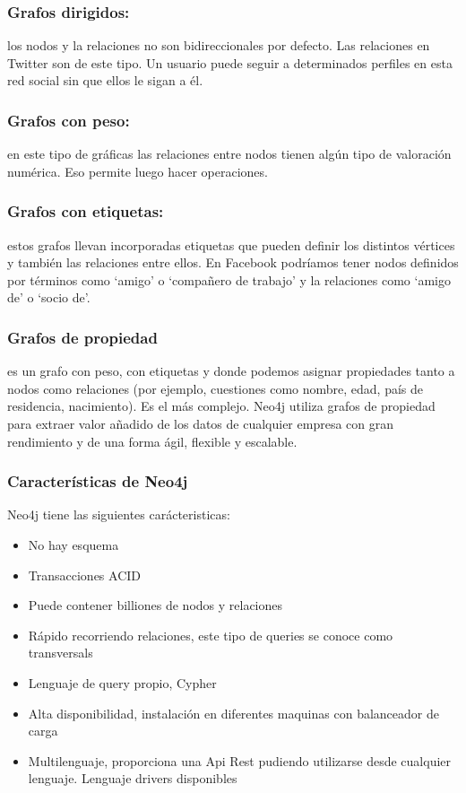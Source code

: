 \subsubsection{ Grafos dirigidos:}
	 los nodos y la relaciones no son bidireccionales por defecto. Las relaciones en Twitter son de este      	tipo. Un usuario puede seguir a determinados perfiles en esta red social sin que ellos le sigan a él.

\subsubsection{Grafos con peso:}
	en este tipo de gráficas las relaciones entre nodos tienen algún tipo de valoración numérica. Eso permite luego hacer operaciones.
\subsubsection{Grafos con etiquetas:}
	estos grafos llevan incorporadas etiquetas que pueden definir los distintos vértices y también las relaciones entre ellos. En Facebook podríamos tener nodos definidos por términos como ‘amigo’ o ‘compañero de trabajo’ y la relaciones como ‘amigo de’ o ‘socio de’.
\subsubsection{Grafos de propiedad}
	es un grafo con peso, con etiquetas y donde podemos asignar propiedades tanto a nodos como relaciones (por ejemplo, cuestiones como nombre, edad, país de residencia, nacimiento). Es el más complejo.
	Neo4j utiliza grafos de propiedad para extraer valor añadido de los datos de cualquier empresa con gran rendimiento y de una forma ágil, flexible y escalable.
\newpage
\subsubsection{Características de Neo4j\cite{19}}
Neo4j tiene las siguientes carácteristicas:
\begin{itemize}
	\item No hay esquema
	\item Transacciones ACID
	\item Puede contener billiones de nodos y relaciones
	\item Rápido recorriendo relaciones, este tipo de queries se conoce como transversals
	\item Lenguaje de query propio, Cypher
	\item Alta disponibilidad, instalación en diferentes maquinas con balanceador de carga
	\item Multilenguaje, proporciona una Api Rest pudiendo utilizarse desde cualquier lenguaje. Lenguaje drivers 			disponibles
\end{itemize}

